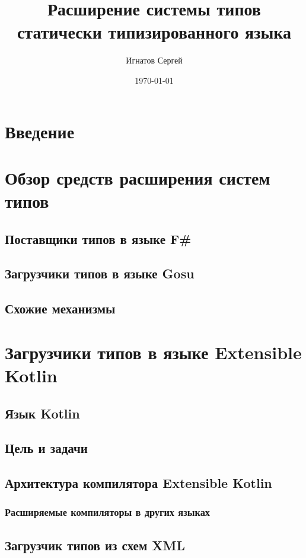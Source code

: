 \documentclass{article}
\title{Расширение системы типов статически типизированного языка}
\author{Игнатов Сергей}
\date{\rudate\today}
\begin{document}
\maketitle
\clearpage
{}
\tableofcontents

\section{Введение}

\section{Обзор средств расширения систем типов}
\subsection{Поставщики типов в языке F\#}
\subsection{Загрузчики типов в языке Gosu}
\subsection{Схожие механизмы}

\section{Загрузчики типов в языке Extensible Kotlin}
\subsection{Язык Kotlin}
\subsection{Цель и задачи}
\subsection{Архитектура компилятора Extensible Kotlin}
\subsubsection{Расширяемые компиляторы в других языках}

\subsection{Загрузчик типов из схем XML}
\end{document}
